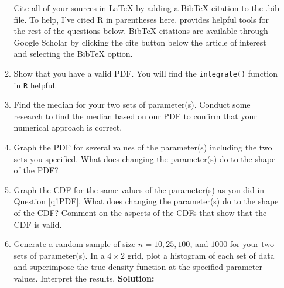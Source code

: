 \documentclass{article}\usepackage[]{graphicx}\usepackage[]{color}
\begin{document}
\begin{enumerate}
\begin{enumerate}
  Cite all of your sources in LaTeX by adding a BibTeX citation to the .bib file. 
  To help, I've cited R \citep{R21} in parentheses here. \cite{R21} provides helpful 
  tools for the rest of the questions below. BibTeX citations are available through 
  Google Scholar by clicking the cite button below the article of  interest and 
  selecting the BibTeX option.
	\item Show that you have a valid PDF. You will find the \texttt{integrate()} 
	function in \texttt{R} helpful.
	\item Find the median for your two sets of parameter(s). Conduct some research 
	to find the median based on our PDF to confirm that your numerical approach is 
	correct. 
	\item \label{q1PDF} Graph the PDF for several values of the parameter(s) 
	including the two sets you specified. What does changing the parameter(s) do 
	to the shape of the PDF?
	 \item Graph the CDF for the same values of the parameter(s) as you did in 
	 Question \ref{q1PDF}. What does changing the parameter(s) do to the shape of 
	 the CDF? Comment on the aspects of the CDFs that show that the CDF is valid.
  \item Generate a random sample of size $n=10, 25, 100$, and $1000$ for your 
  two sets of parameter(s). In a $4 \times 2$ grid, plot a histogram of each set
  of data and superimpose the true density function at the specified parameter 
  values. Interpret the results.
  \textbf{Solution:}
  


\end{enumerate}
\end{enumerate}
\end{document}
